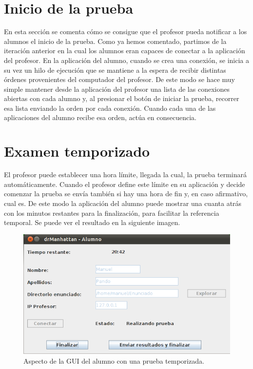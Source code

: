 \section{Inicio de la prueba}
\label{sec:iteracion:iniPrueba}

En esta sección se comenta cómo se consigue que el profesor pueda notificar a los alumnos el inicio de la prueba.
Como ya hemos comentado, partimos de la iteración anterior en la cual los alumnos eran capaces de conectar a la aplicación del profesor. En la aplicación del alumno, cuando se crea una conexión, se inicia a su vez un hilo de ejecución que se mantiene a la espera de recibir distintas órdenes provenientes del computador del profesor. De este modo se hace muy simple mantener desde la aplicación del profesor una lista de las conexiones abiertas con cada alumno y, al presionar el botón de iniciar la prueba, recorrer esa lista enviando la orden por cada conexión.
Cuando cada una de las aplicaciones del alumno recibe esa orden, actúa en consecuencia.

\section{Examen temporizado}
\label{sec:iteracion:examenTemporizado}

El profesor puede establecer una hora límite, llegada la cual, la prueba terminará automáticamente. Cuando el profesor define este límite en su aplicación y decide comenzar la prueba se envía también si hay una hora de fin y, en caso afirmativo, cual es. De este modo la aplicación del alumno puede mostrar una cuanta atrás con los minutos restantes para la finalización, para facilitar la referencia temporal. Se puede ver el resultado en la siguiente imagen.

\begin{figure}[!htb]
    \centering
    \includegraphics[width=.75\linewidth]{iteracion/tiempoRestante}
    \caption{Aspecto de la GUI del alumno con una prueba temporizada.}
    \label{fig:iteracion:tiempoRestante}
\end{figure}


